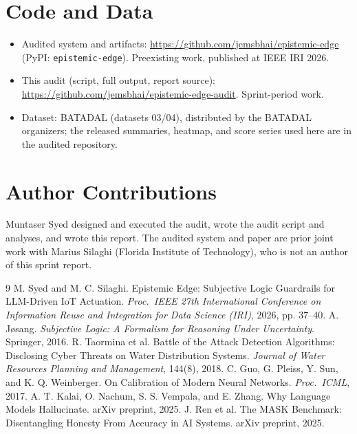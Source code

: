\documentclass[11pt]{article}
\begin{document}
\section*{Code and Data}
\begin{itemize}[leftmargin=*,itemsep=0pt]
\item Audited system and artifacts: \url{https://github.com/jemsbhai/epistemic-edge} (PyPI: \texttt{epistemic-edge}). Preexisting work, published at IEEE IRI 2026.
\item This audit (script, full output, report source): \url{https://github.com/jemsbhai/epistemic-edge-audit}. Sprint-period work.
\item Dataset: BATADAL (datasets 03/04), distributed by the BATADAL organizers; the released summaries, heatmap, and score series used here are in the audited repository.
\end{itemize}

\section*{Author Contributions}
Muntaser Syed designed and executed the audit, wrote the audit script and analyses, and wrote this report. The audited system and paper are prior joint work with Marius Silaghi (Florida Institute of Technology), who is not an author of this sprint report.

\begin{thebibliography}{9}\small
{} M. Syed and M. C. Silaghi. Epistemic Edge: Subjective Logic Guardrails for LLM-Driven IoT Actuation. \textit{Proc.\ IEEE 27th International Conference on Information Reuse and Integration for Data Science (IRI)}, 2026, pp. 37--40.
 A. J\o sang. \textit{Subjective Logic: A Formalism for Reasoning Under Uncertainty}. Springer, 2016.
 R. Taormina et al. Battle of the Attack Detection Algorithms: Disclosing Cyber Threats on Water Distribution Systems. \textit{Journal of Water Resources Planning and Management}, 144(8), 2018.
 C. Guo, G. Pleiss, Y. Sun, and K. Q. Weinberger. On Calibration of Modern Neural Networks. \textit{Proc.\ ICML}, 2017.
 A. T. Kalai, O. Nachum, S. S. Vempala, and E. Zhang. Why Language Models Hallucinate. arXiv preprint, 2025.
 J. Ren et al. The MASK Benchmark: Disentangling Honesty From Accuracy in AI Systems. arXiv preprint, 2025.
\end{thebibliography}
\end{document}
